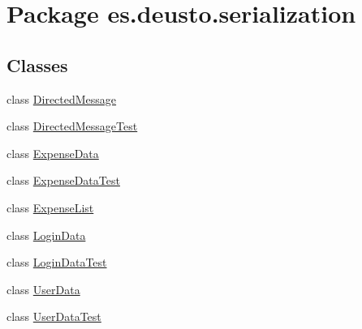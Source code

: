 \hypertarget{namespacees_1_1deusto_1_1serialization}{}\section{Package es.\+deusto.\+serialization}
\label{namespacees_1_1deusto_1_1serialization}
\subsection*{Classes}
\begin{DoxyCompactItemize}
\item 
class \hyperlink{classes_1_1deusto_1_1serialization_1_1_directed_message}{Directed\+Message}
\item 
class \hyperlink{classes_1_1deusto_1_1serialization_1_1_directed_message_test}{Directed\+Message\+Test}
\item 
class \hyperlink{classes_1_1deusto_1_1serialization_1_1_expense_data}{Expense\+Data}
\item 
class \hyperlink{classes_1_1deusto_1_1serialization_1_1_expense_data_test}{Expense\+Data\+Test}
\item 
class \hyperlink{classes_1_1deusto_1_1serialization_1_1_expense_list}{Expense\+List}
\item 
class \hyperlink{classes_1_1deusto_1_1serialization_1_1_login_data}{Login\+Data}
\item 
class \hyperlink{classes_1_1deusto_1_1serialization_1_1_login_data_test}{Login\+Data\+Test}
\item 
class \hyperlink{classes_1_1deusto_1_1serialization_1_1_user_data}{User\+Data}
\item 
class \hyperlink{classes_1_1deusto_1_1serialization_1_1_user_data_test}{User\+Data\+Test}
\end{DoxyCompactItemize}
